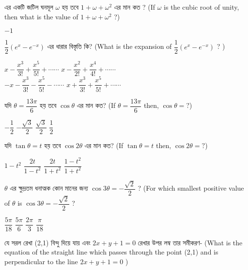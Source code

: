 \documentclass[addpoints]{exam}
\begin{document}
\begin{questions}
 এর একটি জটিল ঘনমূল  $ \omega $ হয় তবে $ 1+\omega +\omega^{2} $ এর মান কত ? (If $ \omega $ is the cubic root of unity, then what is the value of $ 1+\omega +\omega^{2} $ ?)

\begin{oneparchoices}
\choice $ -1 $
\end{oneparchoices}

\question $ \dfrac{1}{2}(e^{x}-e^{-x}) $ এর ধারার বিস্তৃতি কি? (What is the expansion of $ \dfrac{1}{2}(e^{x}-e^{-x}) $ ? )
 

\begin{oneparchoices}
\choice $ x-\dfrac{x^{3}}{3!}+\dfrac{x^{5}}{5!}+\cdots\cdots $ 
\choice $ x-\dfrac{x^{2}}{2!}+\dfrac{x^{4}}{4!}+\cdots\cdots $ \\
\hspace*{-.3cm}\choice $ -x-\dfrac{x^{3}}{3!}-\dfrac{x^{5}}{5!}-\cdots\cdots $
\choice $ x+\dfrac{x^{3}}{3!}+\dfrac{x^{5}}{5!}+\cdots\cdots $
\end{oneparchoices}

\question  যদি $ \theta = \dfrac{13\pi}{6} $ হয় তবে $ \cos\theta $ এর মান কত? (If $ \theta = \dfrac{13\pi}{6} $ then, $ \cos\theta = ?$)

\begin{oneparchoices}
\choice $ -\dfrac{1}{2} $
\choice $ -\dfrac{\sqrt{3}}{2} $
\choice $ \dfrac{\sqrt{3}}{2} $
\choice $ \dfrac{1}{2} $
\end{oneparchoices}


\question  যদি $ \tan\theta = t $ হয় তবে $ \cos 2\theta $ এর মান কত? (If $ \tan\theta = t $ then, $ \cos 2\theta = ?$)

\begin{oneparchoices}
\choice $ 1-t^{2} $
\choice $ \dfrac{2t}{1-t^{2}} $
\choice $ \dfrac{2t}{1+t^{2}} $
\choice $ \dfrac{1-t^{2}}{1+t^{2}} $
\end{oneparchoices}

\question $ \theta $ এর ক্ষুদ্রতম ধনাত্মক কোন মানের জন্য $ \cos 3\theta = -\dfrac{\sqrt{2}}{2}  $ ? (For which smallest positive value of $ \theta $ is $ \cos 3\theta = -\dfrac{\sqrt{2}}{2} $ ?

\begin{oneparchoices}
\choice $ \dfrac{5\pi}{18} $
\choice $ \dfrac{5\pi}{6} $
\choice $ \dfrac{2\pi}{3} $
\choice $ \dfrac{\pi}{18} $
\end{oneparchoices}

\question যে সরল রেখা (2,1) বিন্দু দিয়ে যায় এবং $ 2x+y+1=0 $ রেখার উপর লম্ব তার সমীকরণ- (What is the equation of the straight line which passes through the point (2,1) and is perpendicular to the line $ 2x+y+1=0 $ )


\end{questions}
\end{document}
